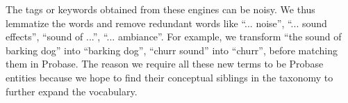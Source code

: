 The tags or keywords obtained from these engines can be noisy. We thus
lemmatize the words and remove redundant words like ``... noise'',
``... sound effects'', ``sound of ...'', ``... ambiance''. For example,
we transform ``the sound of barking dog'' into ``barking dog'',
``churr sound'' into ``churr'', before matching them in Probase. The reason
we require all these new terms to be Probase entities because we hope to find
their conceptual siblings in the taxonomy to further expand the vocabulary.

%

